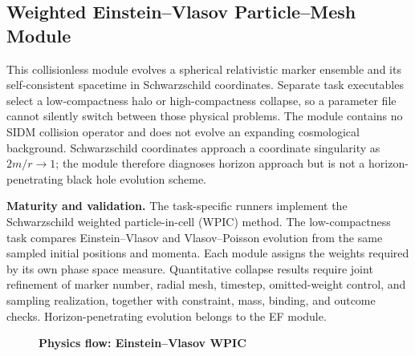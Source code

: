 \subsection{Weighted Einstein--Vlasov Particle--Mesh Module}
\label{sec:weighted-einstein-vlasov-pic}

This collisionless module evolves a spherical relativistic marker ensemble
and its self-consistent spacetime in Schwarzschild coordinates.  Separate task
executables select a low-compactness halo or high-compactness collapse, so a
parameter file cannot silently switch between those physical problems.  The
module contains no SIDM collision operator and does not evolve an expanding
cosmological background.  Schwarzschild coordinates approach a coordinate
singularity as \(2m/r\rightarrow1\); the module therefore diagnoses horizon
approach but is not a horizon-penetrating black hole evolution scheme.

\noindent\textbf{Maturity and validation.}
The task-specific runners implement the Schwarzschild weighted
particle-in-cell (WPIC) method.  The low-compactness task compares
Einstein--Vlasov and Vlasov--Poisson evolution from the same sampled initial
positions and momenta.  Each module assigns the weights required by its own
phase space measure.  Quantitative collapse results require joint refinement
of marker number, radial mesh, timestep, omitted-weight control, and sampling
realization, together with constraint, mass, binding, and outcome checks.
Horizon-penetrating evolution belongs to the EF module.

\begin{figure}[htbp]
\centering
\textbf{Physics flow: Einstein--Vlasov WPIC}
\par\smallskip
{}
\end{figure}

